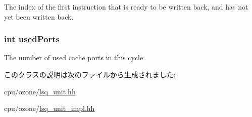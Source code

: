 \label{classOzoneLSQ_a9023e0813d4f3e566d17fb6334a2da02}
The index of the first instruction that is ready to be written back, and has not yet been written back. \hypertarget{classOzoneLSQ_a03435d626b7567ed154de5d7d8c3d419}{
\subsubsection[{usedPorts}]{\setlength{\rightskip}{0pt plus 5cm}int {\bf usedPorts}}}
\label{classOzoneLSQ_a03435d626b7567ed154de5d7d8c3d419}
The number of used cache ports in this cycle. 

このクラスの説明は次のファイルから生成されました:\begin{DoxyCompactItemize}
\item 
cpu/ozone/\hyperlink{ozone_2lsq__unit_8hh}{lsq\_\-unit.hh}\item 
cpu/ozone/\hyperlink{ozone_2lsq__unit__impl_8hh}{lsq\_\-unit\_\-impl.hh}\end{DoxyCompactItemize}
